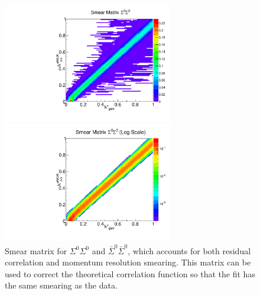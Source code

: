 \begin{figure}[ht]
\begin{minipage}{17.5pc}
\includegraphics[width=17.5pc]{Figures/SmearMatrices/2016-7-19-SmearMatrixSigmaSigmaNormLLAA.pdf}
\end{minipage}\hspace{0.5pc}
\begin{minipage}{17.5pc}
\includegraphics[width=17.5pc]{Figures/SmearMatrices/2016-7-19-SmearMatrixSigmaSigmaNormLLAALog.pdf}
\end{minipage} 
\caption[Smear matrix -- $\Sigma^0\Sigma^0$ and $\bar{\Sigma}^0\bar{\Sigma}^0$]{
Smear matrix for $\Sigma^0\Sigma^0$ and $\bar{\Sigma}^0\bar{\Sigma}^0$, which accounts for both residual correlation and momentum resolution smearing. This matrix can be used to correct the theoretical correlation function so that the fit has the same smearing as the data.
}
\end{figure}



